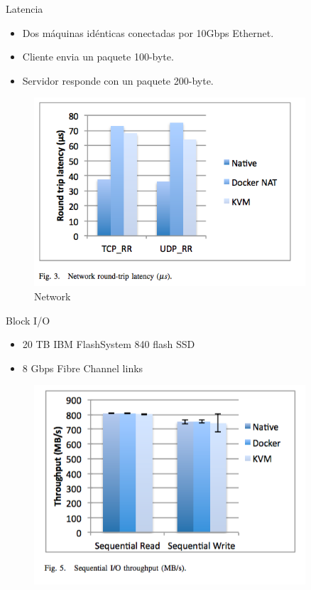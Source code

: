 \documentclass[compress]{beamer}
\begin{document}
\begin{frame}{Latencia}
	\begin{itemize}
		\item Dos máquinas idénticas conectadas por 10Gbps Ethernet.
		\item Cliente envia un paquete 100-byte.
		\item Servidor responde con un paquete 200-byte.
	\end{itemize}
\begin{figure}[H]
  \centering
  \includegraphics[width=0.9\textwidth]{images/latency.png}
    \caption{Network}
    \label{fig:dynamic}
\end{figure}	
\end{frame}

\begin{frame}{Block I/O}
	\begin{itemize}
		\item 20 TB IBM FlashSystem 840 flash SSD
		\item 8 Gbps Fibre Channel links
	\end{itemize}
\begin{figure}[H]
  \centering
  \includegraphics[width=0.9\textwidth]{images/block}
    \label{fig:dynamic}
\end{figure}	
\end{frame}
\end{document}

